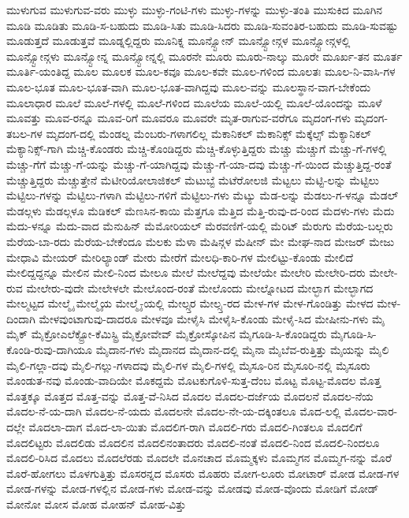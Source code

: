 {ಮುಳುಗುವ
ಮುಳುಗುವ-ವರು
ಮುಳ್ಳು
ಮುಳ್ಳು-ಗಂಟಿ-ಗಳು
ಮುಳ್ಳು-ಗಳನ್ನು
ಮುಳ್ಳು-ತಂತಿ
ಮುಸುಕಿದ
ಮೂಗಿನ
ಮೂಡಿ
ಮೂಡಿತು
ಮೂಡಿ-ಸ-ಬಹುದು
ಮೂಡಿ-ಸಿತು
ಮೂಡಿ-ಸಿದರು
ಮೂಡಿ-ಸುವಂತಿರ-ಬಹುದು
ಮೂಡಿ-ಸುವಷ್ಟು
ಮೂಡುತ್ತದೆ
ಮೂಡುತ್ತವೆ
ಮೂಡ್ನಲ್ಲಿದ್ದರು
ಮೂನಿಕ್ನ
ಮೂನ್ಸ್ಟೋನ್
ಮೂನ್ಸ್ಟೋನ್ಗಳ
ಮೂನ್ಸ್ಟೋನ್ಗಳಲ್ಲಿ
ಮೂನ್ಸ್ಟೋನ್ಗಳು
ಮೂನ್ಸ್ಟೋನ್ನ
ಮೂನ್ಸ್ಟೋನ್ನಲ್ಲಿ
ಮೂರನೇ
ಮೂರು
ಮೂರು-ನಾಲ್ಕು
ಮೂರೇ
ಮೂರ್ಖ-ತನ
ಮೂರ್ತ
ಮೂರ್ತಿ-ಯಂತಿದ್ದ
ಮೂಲ
ಮೂಲಕ
ಮೂಲ-ಕವೂ
ಮೂಲ-ಕವೇ
ಮೂಲ-ಗಳಿಂದ
ಮೂಲತಃ
ಮೂಲ-ನಿ-ವಾಸಿ-ಗಳ
ಮೂಲ-ಭೂತ
ಮೂಲ-ಭೂತ-ವಾಗಿ
ಮೂಲ-ಭೂತ-ವಾಗಿದ್ದವು
ಮೂಲ-ವನ್ನು
ಮೂಲಸ್ಥಾನ-ವಾಗ-ಬೇಕೆಂದು
ಮೂಲಾಧಾರ
ಮೂಲೆ
ಮೂಲೆ-ಗಳಲ್ಲಿ
ಮೂಲೆ-ಗಳಿಂದ
ಮೂಲೆಯ
ಮೂಲೆ-ಯಲ್ಲಿ
ಮೂಲೆ-ಯೊಂದನ್ನು
ಮೂಳೆ
ಮೂವತ್ತು
ಮೂವ-ರನ್ನೂ
ಮೂವ-ರಿಗೆ
ಮೂವರೂ
ಮೂವರೇ
ಮೃತ-ರಾಗುವ-ವರೆಗೂ
ಮೃದಂಗ-ಗಳು
ಮೃದಂಗ-ತಬಲ-ಗಳ
ಮೃದಂಗ-ದಲ್ಲಿ
ಮೆಂಡಲ್ನ
ಮೆಂಬರು-ಗಳಾಗಲಿಲ್ಲ
ಮೆಕಾನಿಕಲ್
ಮೆಕಾನಿಕ್ಸ್
ಮೆಕ್ಕೆಲ್ಸ್
ಮೆಕ್ಯಾನಿಕಲ್
ಮೆಕ್ಯಾನಿಕ್ಸ್-ಗಾಗಿ
ಮೆಚ್ಚಿ-ಕೊಂಡರು
ಮೆಚ್ಚಿ-ಕೊಂಡಿದ್ದರು
ಮೆಚ್ಚಿ-ಕೊಳ್ಳುತ್ತಿದ್ದರು
ಮೆಚ್ಚು
ಮೆಚ್ಚುಗೆ
ಮೆಚ್ಚು-ಗೆ-ಗಳಲ್ಲಿ
ಮೆಚ್ಚು-ಗೆಗೆ
ಮೆಚ್ಚು-ಗೆ-ಯನ್ನು
ಮೆಚ್ಚು-ಗೆ-ಯಾಗಿದ್ದವು
ಮೆಚ್ಚು-ಗೆ-ಯಾ-ದವು
ಮೆಚ್ಚು-ಗೆ-ಯಿಂದ
ಮೆಚ್ಚುತ್ತಿದ್ದ-ರಂತೆ
ಮೆಚ್ಚುತ್ತಿದ್ದರು
ಮೆಚ್ಚುತ್ತೇನೆ
ಮೆಟೀರಿಯೋಲಾಜಿಕಲ್
ಮೆಟುಬ್ಟೆ
ಮೆಟೆರೋಲಜಿ
ಮೆಟ್ಟಲು
ಮೆಟ್ಟಿ-ಲನ್ನು
ಮೆಟ್ಟಿಲು
ಮೆಟ್ಟಿಲು-ಗಳನ್ನು
ಮೆಟ್ಟಿಲು-ಗಳಾಗಿ
ಮೆಟ್ಟಿಲು-ಗಳಿಗೆ
ಮೆಟ್ಟಿಲು-ಗಳು
ಮೆಟ್ಯು
ಮೆಡ-ಲನ್ನು
ಮೆಡಲು-ಗ-ಳನ್ನೂ
ಮೆಡಲ್
ಮೆಡಲ್ಗಳು
ಮೆಡಲ್ಗಳೂ
ಮೆಡಿಕಲ್
ಮೆಣಸಿನ-ಕಾಯಿ
ಮೆತ್ತಗೂ
ಮೆತ್ತಿದ
ಮೆತ್ತಿ-ರುವು-ದ-ರಿಂದ
ಮೆದಳು-ಗಳು
ಮೆದು
ಮೆದು-ಳನ್ನೂ
ಮೆದು-ವಾದ
ಮೆನುಹಿನ್
ಮೆಮೋರಿಯಲ್
ಮೆರವಣಿಗೆ-ಯಲ್ಲಿ
ಮೆರಿಟ್
ಮೆರುಗು
ಮೆರೆಯ-ಬಲ್ಲರು
ಮೆರೆಯ-ಬಾ-ರದು
ಮೆರೆಯ-ಬೇಕೆಂದೂ
ಮೆಲಕು
ಮೆಳಾ
ಮೆಷಿನ್ಗಳ
ಮೆಷೀನ್
ಮೇ
ಮೇಘ-ನಾದ
ಮೇಜರ್
ಮೇಜು
ಮೇಧಾವಿ
ಮೇಯರ್
ಮೇರಿಲ್ಯಾಂಡ್
ಮೇರು
ಮೇರೆಗೆ
ಮೇಲಧಿ-ಕಾರಿ-ಗಳ
ಮೇಲಿಟ್ಟು-ಕೊಂಡು
ಮೇಲಿದೆ
ಮೇಲಿದ್ದದ್ದನ್ನೂ
ಮೇಲಿನ
ಮೇಲಿ-ನಿಂದ
ಮೇಲೂ
ಮೇಲೆ
ಮೇಲೆದ್ದವು
ಮೇಲೆಯೇ
ಮೇಲೇರಿ
ಮೇಲೇರಿ-ದರು
ಮೇಲೇ-ರುವ
ಮೇಲೇರು-ವುದೇ
ಮೇಲೇಳಲೇ
ಮೇಲೊಂದ-ರಂತೆ
ಮೇಲೊಂದು
ಮೇಲ್ನೋಟದ
ಮೇಲ್ಭಾಗ
ಮೇಲ್ಭಾಗದ
ಮೇಲ್ಮಟ್ಟದ
ಮೇಲ್ಮೈ
ಮೇಲ್ಮೈಯ
ಮೇಲ್ಮೈ-ಯಲ್ಲಿ
ಮೇಲ್ಸ್ತರ
ಮೇಲ್ಸ್ತ-ರದ
ಮೇಳ-ಗಳ
ಮೇಳ-ಗೊಂಡಿತ್ತು
ಮೇಳದ
ಮೇಳ-ದಿಂದಾಗಿ
ಮೇಳವುಂಟಾಗುವು-ದಾದರೂ
ಮೇಳವೂ
ಮೇಳೈಸಿ
ಮೇಳೈಸಿ-ಕೊಂಡು
ಮೇಳೈ-ಸಿದ
ಮೇಷೀನು-ಗಳು
ಮೈ
ಮೈಕ್
ಮೈಕ್ರೋಎಲೆಕ್ಟ್ರೋ-ಕೆಮಿಸ್ಟ್ರಿ
ಮೈಕ್ರೋವೇವ್
ಮೈಕ್ರೋಸ್ಕೋಪಿನ
ಮೈಗೂಡಿ-ಸಿ-ಕೊಂಡಿದ್ದರು
ಮೈಗೂಡಿ-ಸಿ-ಕೊಂಡಿ-ರುವು-ದಾಗಿಯೂ
ಮೈದಾನ-ಗಳು
ಮೈದಾನದ
ಮೈದಾನ-ದಲ್ಲಿ
ಮೈನಾ
ಮೈಬೆವ-ರುತ್ತಿತ್ತು
ಮೈಯನ್ನು
ಮೈಲಿ
ಮೈಲಿ-ಗಲ್ಲಾ-ದವು
ಮೈಲಿ-ಗಲ್ಲು-ಗಳಾದವು
ಮೈಲಿ-ಗಳ
ಮೈಲಿ-ಗಳಲ್ಲಿ
ಮೈಸೂ-ರಿನ
ಮೈಸೂರಿ-ನಲ್ಲಿ
ಮೈಸೂರು
ಮೊಂಡುತ-ನವು
ಮೊಂಡು-ವಾದಿಯೇ
ಮೊಕದ್ದಮೆ
ಮೊಟಕುಗೊಳಿ-ಸುತ್ತ-ದೆಂಬ
ಮೊಟ್ಟ
ಮೊಟ್ಟ-ಮೊದಲ
ಮೊತ್ತ
ಮೊತ್ತಕ್ಕೂ
ಮೊತ್ತದ
ಮೊತ್ತ-ವನ್ನು
ಮೊತ್ತ-ವೆ-ನಿಸಿದ
ಮೊದಲ
ಮೊದಲ-ದರ್ಜೆಯ
ಮೊದಲನೆ
ಮೊದಲ-ನೆಯ
ಮೊದಲ-ನೆ-ಯ-ದಾಗಿ
ಮೊದಲ-ನೆ-ಯದು
ಮೊದಲನೇ
ಮೊದಲ-ನೇ-ಯ-ದಕ್ಕಿಂತಲೂ
ಮೊದ-ಲಲ್ಲಿ
ಮೊದಲ-ವಾರ-ದಲ್ಲೇ
ಮೊದಲಾ-ದಾಗ
ಮೊದ-ಲಾ-ಯಿತು
ಮೊದಲಿಗ-ರಾಗಿ
ಮೊದಲಿ-ಗರು
ಮೊದಲಿ-ಗಿಂತಲೂ
ಮೊದಲಿಗೆ
ಮೊದಲಿಟ್ಟರು
ಮೊದಲಿಡು
ಮೊದಲಿನ
ಮೊದಲಿನಂತಾದರು
ಮೊದಲಿ-ನಂತೆ
ಮೊದಲಿ-ನಿಂದ
ಮೊದಲಿ-ನಿಂದಲೂ
ಮೊದಲಿ-ರಿಸಿದ
ಮೊದಲು
ಮೊದಲೆರಡು
ಮೊದಲೇ
ಮೊನಚಾದ
ಮೊಮ್ಮಕ್ಕಳು
ಮೊಮ್ಮಗನ
ಮೊಮ್ಮಗ-ನನ್ನು
ಮೊರೆ
ಮೊರೆ-ಹೋಗಲು
ಮೊಳಗುತ್ತಿತ್ತು
ಮೊಸರನ್ನದ
ಮೊಸರು
ಮೊಹರು
ಮೋಗ-ಲೂರು
ಮೋಟಾರ್
ಮೋಡ
ಮೋಡ-ಗಳ
ಮೋಡ-ಗಳನ್ನು
ಮೋಡ-ಗಳಲ್ಲಿನ
ಮೋಡ-ಗಳು
ಮೋಡ-ವನ್ನು
ಮೋಡವು
ಮೋಡ-ವೊಂದು
ಮೋಡಿಗೆ
ಮೋಡ್
ಮೋನೋ
ಮೋಸ
ಮೋಹ
ಮೋಹನ್
ಮೋಹ-ವಿತ್ತು
}
